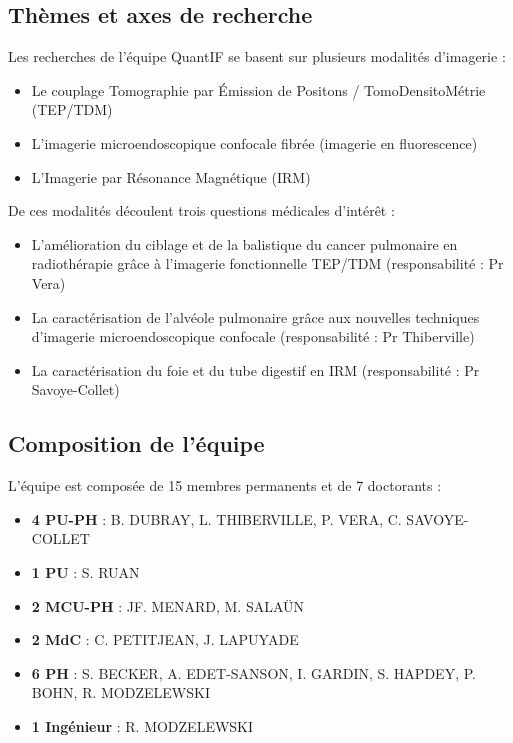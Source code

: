 \documentclass[12pt,a4paper]{report}
\begin{document}
\subsection{Thèmes et axes de recherche}

Les recherches de l'équipe QuantIF se basent sur plusieurs modalités d'imagerie :

\begin{itemize}
\item Le couplage Tomographie par Émission de Positons / TomoDensitoMétrie (TEP/TDM)
\item L'imagerie microendoscopique confocale fibrée (imagerie en fluorescence)
\item L'Imagerie par Résonance Magnétique (IRM)
\end{itemize}

De ces modalités découlent trois questions médicales d'intérêt :

\begin{itemize}
\item L'amélioration du ciblage et de la balistique du cancer pulmonaire en radiothérapie grâce à l'imagerie fonctionnelle TEP/TDM (responsabilité : Pr Vera)
\item La caractérisation de l'alvéole pulmonaire grâce aux nouvelles techniques d'imagerie microendoscopique confocale (responsabilité : Pr Thiberville)
\item La caractérisation du foie et du tube digestif en IRM (responsabilité : Pr Savoye-Collet)
\end{itemize}

\subsection{Composition de l'équipe}

L'équipe est composée de 15 membres permanents et de 7 doctorants :

\begin{itemize}
\item \textbf{4 PU-PH} : B. DUBRAY, L. THIBERVILLE, P. VERA, C. SAVOYE-COLLET
\item \textbf{1 PU} : S. RUAN
\item \textbf{2 MCU-PH} : JF. MENARD, M. SALAÜN
\item \textbf{2 MdC} : C. PETITJEAN, J. LAPUYADE
\item \textbf{6 PH} : S. BECKER, A. EDET-SANSON, I. GARDIN, S. HAPDEY, P. BOHN, R. MODZELEWSKI
\item \textbf{1 Ingénieur} : R. MODZELEWSKI
\end{itemize}
\end{document}
